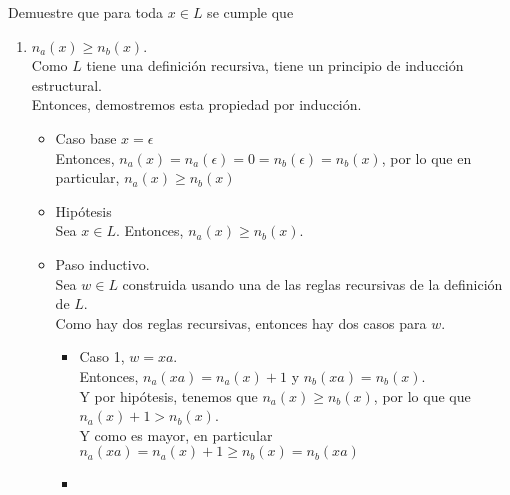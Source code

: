 \documentclass{article}
\begin{document}
\begin{enumerate}
{            Demuestre que para toda $x \in L$ se cumple que
            \begin{enumerate}
                \item {
                    $n_a(x) \geq n_b(x)$.\\
                    Como $L$ tiene una definición recursiva, tiene un principio 
                    de inducción estructural.\\
                    Entonces, demostremos esta propiedad por inducción.
                    \begin{itemize}
                        \item {
                            Caso base $x = \epsilon$ \\
                            Entonces, $n_a(x) = n_a(\epsilon) = 0 = 
                            n_b(\epsilon) = n_b(x)$, por lo que en 
                            particular, $n_a(x) \geq n_b(x)$
                        }
                        \item {
                            Hipótesis \\
                            Sea $x \in L$. Entonces, $n_a(x) \geq n_b(x)$.
                        }
                        \item {
                            Paso inductivo.\\
                            Sea $w \in L$ construida usando una de las reglas 
                            recursivas de la definición de $L$.\\
                            Como hay dos reglas recursivas, entonces hay dos 
                            casos para $w$.
                            \begin{itemize}
                                \item {
                                    Caso 1, $w = xa$.\\
                                    Entonces, $n_a(xa) = n_a(x) + 1$ y
                                    $n_b(xa) = n_b(x)$.\\ 
                                    Y por hipótesis, tenemos que 
                                    $n_a(x) \geq n_b(x)$, por lo que que 
                                    $n_a(x) + 1 > n_b(x)$.\\
                                    Y como es mayor, en particular 
                                    $n_a(xa) = n_a(x) + 1 \geq n_b(x) = n_b(xa)$
                                }
                                \item {
}
\end{itemize}}
\end{itemize}}
\end{enumerate}}
\end{enumerate}
\end{document}
